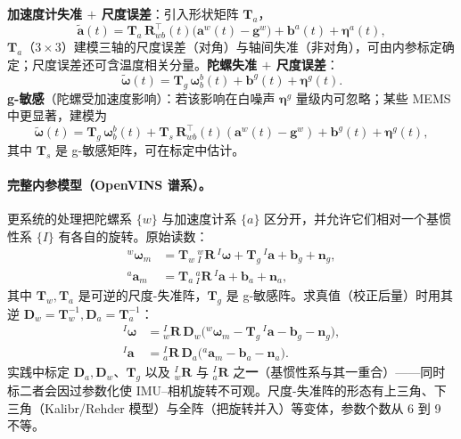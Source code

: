 \textbf{加速度计失准 $+$ 尺度误差}：引入形状矩阵 $\mathbf T_a$，
\begin{equation}
  \tilde{\mathbf a}(t)=\mathbf T_a\,\mathbf R_{wb}^\top(t)\big(\mathbf a^w(t)-\mathbf g^w\big)+\mathbf b^a(t)+\boldsymbol\eta^a(t),
  \label{eq:imu-accel-ext}
\end{equation}
$\mathbf T_a$（$3\times3$）建模三轴的尺度误差（对角）与轴间失准（非对角），可由内参标定确定；尺度误差还可含温度相关分量\cite{carlone2026handbook}。\textbf{陀螺失准 $+$ 尺度误差}：
\begin{equation}
  \tilde{\boldsymbol\omega}(t)=\mathbf T_g\,\boldsymbol\omega_b^b(t)+\mathbf b^g(t)+\boldsymbol\eta^g(t).
  \label{eq:imu-gyro-ext}
\end{equation}
\textbf{g-敏感}（陀螺受加速度影响）：若该影响在白噪声 $\boldsymbol\eta^g$ 量级内可忽略；某些 MEMS 中更显著，建模为
\begin{equation}
  \tilde{\boldsymbol\omega}(t)=\mathbf T_g\,\boldsymbol\omega_b^b(t)+\mathbf T_s\,\mathbf R_{wb}^\top(t)(\mathbf a^w(t)-\mathbf g^w)+\mathbf b^g(t)+\boldsymbol\eta^g(t),
  \label{eq:imu-gsens}
\end{equation}
其中 $\mathbf T_s$ 是 g-敏感矩阵，可在标定中估计\cite{carlone2026handbook}。

\paragraph{完整内参模型（OpenVINS 谱系）。}
更系统的处理把陀螺系 $\{w\}$ 与加速度计系 $\{a\}$ 区分开，并允许它们相对一个基惯性系 $\{I\}$ 有各自的旋转\cite{yang2022online}。原始读数：
\begin{align}
  {}^w\boldsymbol\omega_m&=\mathbf T_w\,{}^w_I\mathbf R\,{}^I\boldsymbol\omega+\mathbf T_g\,{}^I\mathbf a+\mathbf b_g+\mathbf n_g, \label{eq:imu-intr-gyro}\\
  {}^a\mathbf a_m&=\mathbf T_a\,{}^a_I\mathbf R\,{}^I\mathbf a+\mathbf b_a+\mathbf n_a, \label{eq:imu-intr-accel}
\end{align}
其中 $\mathbf T_w,\mathbf T_a$ 是可逆的尺度-失准阵，$\mathbf T_g$ 是 g-敏感阵。求真值（校正后量）时用其逆 $\mathbf D_w=\mathbf T_w^{-1},\mathbf D_a=\mathbf T_a^{-1}$：
\begin{align}
  {}^I\boldsymbol\omega&={}^I_w\mathbf R\,\mathbf D_w\big({}^w\boldsymbol\omega_m-\mathbf T_g\,{}^I\mathbf a-\mathbf b_g-\mathbf n_g\big), \label{eq:imu-intr-gyro-inv}\\
  {}^I\mathbf a&={}^I_a\mathbf R\,\mathbf D_a\big({}^a\mathbf a_m-\mathbf b_a-\mathbf n_a\big). \label{eq:imu-intr-accel-inv}
\end{align}
实践中标定 $\mathbf D_a,\mathbf D_w$、$\mathbf T_g$ 以及 ${}^I_w\mathbf R$ 与 ${}^I_a\mathbf R$ 之\textbf{一}（基惯性系与其一重合）——同时标二者会因过参数化使 IMU--相机旋转不可观\cite{yang2022online}。尺度-失准阵的形态有上三角、下三角（Kalibr/Rehder 模型）与全阵（把旋转并入）等变体，参数个数从 6 到 9 不等。

